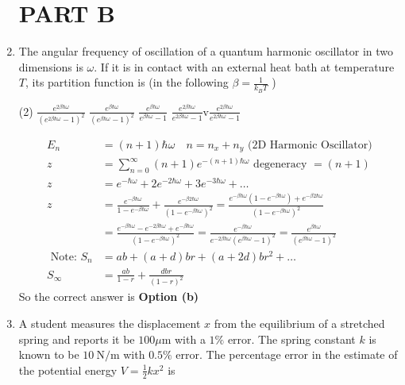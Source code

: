 \begin{enumerate}
\section{PART B}
\item The angular frequency of oscillation of a quantum harmonic oscillator in two dimensions is $\omega$. If it is in contact with an external heat bath at temperature $T$, its partition function is (in the following $\beta=\frac{1}{k_{B} T}$ )
 \begin{tasks}(2)
	\task[\textbf{a.}]$\frac{e^{2 \beta \hbar \omega}}{\left(e^{2 \beta \hbar \omega}-1\right)^{2}}$
	\task[\textbf{b.}]$\frac{e^{\beta \hbar \omega}}{\left(e^{\beta \hbar \omega}-1\right)^{2}}$
	\task[\textbf{c.}]$\frac{e^{\beta \hbar \omega}}{e^{\beta \hbar \omega}-1}$
	\task[\textbf{d.}] $\frac{e^{2 \beta \hbar \omega}}{e^{2 \beta \hbar \omega}-1}$v$\frac{e^{2 \beta \hbar \omega}}{e^{2 \beta \hbar \omega}-1}$
\end{tasks}
\begin{answer}
	\begin{align*}
	E_{n}&=(n+1) \hbar \omega \quad n=n_{x}+n_{y}
\text{	(2D Harmonic Oscillator)}\\
z&=\sum_{n=0}^{\infty}(n+1) e^{-(n+1) \hbar \omega} \text { degeneracy }=(n+1)\\
z&=e^{-\hbar \omega}+2 e^{-2 \hbar \omega}+3 e^{-3 \hbar \omega}+\ldots\\
z&=\frac{e^{-\beta \hbar \omega}}{1-e^{-\beta \hbar \omega}}+\frac{e^{-\beta 2 \hbar \omega}}{\left(1-e^{-\beta \hbar \omega}\right)^{2}}=\frac{e^{-\beta \hbar \omega}\left(1-e^{-\beta \hbar \omega}\right)+e^{-\beta 2 \hbar \omega}}{\left(1-e^{-\beta \hbar \omega}\right)^{2}}\\
&=\frac{e^{-\beta \hbar \omega}-e^{-2 \beta \hbar \omega}+e^{-\beta \hbar \omega}}{\left(1-e^{-\beta \hbar \omega}\right)^{2}}=\frac{e^{-\beta \hbar \omega}}{e^{-2 \beta \hbar \omega}\left(e^{\beta \hbar \omega}-1\right)^{2}}=\frac{e^{\beta \hbar \omega}}{\left(e^{\beta \hbar \omega}-1\right)^{2}}\\
\text { Note: } S_{n}&=a b+(a+d) b r+(a+2 d) b r^{2}+\ldots\\
S_{\infty}&=\frac{a b}{1-r}+\frac{d b r}{(1-r)^{2}}
	\end{align*}
		So the correct answer is \textbf{Option (b)}
\end{answer}
\item A student measures the displacement $x$ from the equilibrium of a stretched spring and reports it be $100 \mu \mathrm{m}$ with a $1 \%$ error. The spring constant $k$ is known to be $10 \mathrm{~N} / \mathrm{m}$ with $0.5 \%$ error. The percentage error in the estimate of the potential energy $V=\frac{1}{2} k x^{2}$ is

\end{enumerate}
